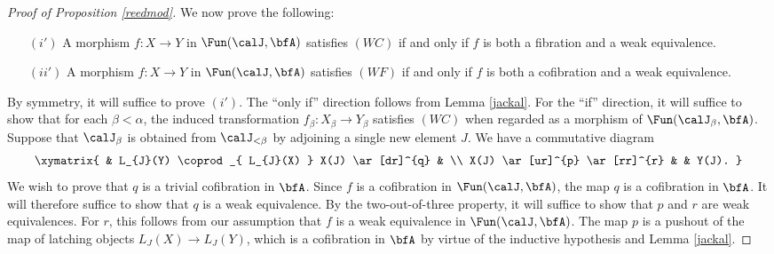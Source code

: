 \begin{Model Categories}
\begin{Didn't Read}
\begin{proof}[Proof of Proposition \ref{reedmod}]
We now prove the following:
\begin{itemize}
\item[$(i')$] A morphism $f: X \rightarrow Y$ in $\Fun(\calJ, \bfA)$ satisfies $(WC)$ if and only if
$f$ is both a fibration and a weak equivalence.
\item[$(ii')$] A morphism $f: X \rightarrow Y$ in $\Fun(\calJ, \bfA)$ satisfies $(WF)$ if and only if $f$ is both a cofibration and a weak equivalence.
\end{itemize}
By symmetry, it will suffice to prove $(i')$. The ``only if'' direction follows from
Lemma \ref{jackal}. For the ``if'' direction, it will suffice to show that for
each $\beta < \alpha$, the induced transformation
$f_{\beta}: X_{\beta} \rightarrow Y_{\beta}$ satisfies $(WC)$ when regarded as a morphism
of $\Fun( \calJ_{\beta}, \bfA)$. Suppose that $\calJ_{\beta}$ is obtained from $\calJ_{< \beta}$ by adjoining a single new element $J$. We have a commutative diagram
$$ \xymatrix{ & L_{J}(Y) \coprod_{ L_{J}(X) } X(J) \ar[dr]^{q} & \\
X(J) \ar[ur]^{p} \ar[rr]^{r} & & Y(J). }$$
We wish to prove that $q$ is a trivial cofibration in $\bfA$. Since $f$ is a cofibration in $\Fun(\calJ, \bfA)$, the map $q$ is a cofibration in $\bfA$. It will therefore suffice to show that
$q$ is a weak equivalence. By the two-out-of-three property, it will suffice to show that
$p$ and $r$ are weak equivalences. For $r$, this follows from our assumption that
$f$ is a weak equivalence in $\Fun(\calJ, \bfA)$. The map $p$ is a pushout of the map of latching objects $L_{J}(X) \rightarrow L_{J}(Y)$, which is a cofibration in $\bfA$ by virtue of the inductive hypothesis and Lemma \ref{jackal}.


\end{proof}
\end{Didn't Read}
\end{Model Categories}
